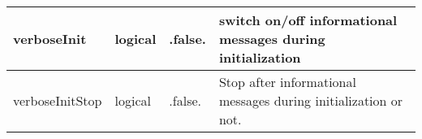 \documentclass{article}
\begin{document}
\begin{longtable}{llll}
\midrule
verboseInit & \begin{minipage}[t]{2cm}logical\end{minipage} & \begin{minipage}[t]{2cm}.false.\end{minipage} & \begin{minipage}[t]{12cm}switch on/off informational messages during initialization\end{minipage}\\*
\midrule
verboseInitStop & \begin{minipage}[t]{2cm}logical\end{minipage} & \begin{minipage}[t]{2cm}.false.\end{minipage} & \begin{minipage}[t]{12cm}Stop after informational messages during initialization or not.\end{minipage}\\*
\bottomrule
\end{longtable}
{ }



\end{document}
